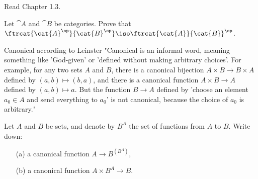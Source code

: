 \def\pathToRoot{../../}



\author{Joachim Bard, Maximilian Wuttke, Nikita Ziuzin}


\begin{hint}
  Read Chapter 1.3.
\end{hint}

\begin{exercise}
	Let $\cat{A}$ and $\cat{B}$ be categories.  Prove that
	$\ftrcat{\cat{A}^\op}{\cat{B}^\op} \iso \ftrcat{\cat{A}}{\cat{B}}^\op$.
\end{exercise}

\begin{exercise}

  \begin{definition}{Canonical according to Leinster}
     "Canonical is an informal word, meaning something like 'God-given' or
    'defined without making arbitrary choices'.  For example, for any two sets
    $A$ and $B$, there is a canonical bijection $A \times B \to B \times A$
    defined by $(a, b) \mapsto (b, a)$, and there is a canonical function $A
    \times B \to A$ defined by $(a, b) \mapsto a$.  But the function $B \to A$
    defined by 'choose an element $a_0 \in A$ and send everything to $a_0$' is
    not canonical, because the choice of $a_0$ is arbitrary."
  \end{definition}
	Let $A$ and $B$ be sets, and denote by $B^A$ the set of functions from $A$
	to $B$.  Write down:
	\begin{itemize}
		\item[(a)] a canonical function $A \to B^{(B^A)}$,
		\item[(b)] a canonical function $A \times B^{A} \to B$.
	\end{itemize}
\end{exercise}

